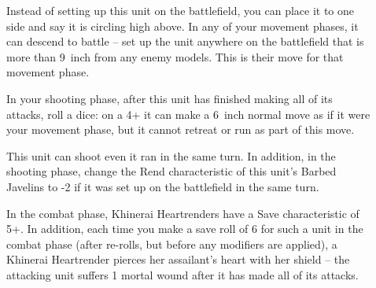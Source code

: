 \begin{description}
    \item [] Instead of setting
        up this unit on the battlefield, you can place it to one side and say
        it is circling high above. In any of your movement phases, it can
        descend to battle – set up the unit anywhere on the battlefield that is
        more than 9~inch from any enemy models. This is their move for that
        movement phase.
    \item [] In your shooting phase,
        after this unit has finished making all of its attacks, roll a dice: on
        a 4+ it can make a 6~inch normal move as if it were your movement
        phase, but it cannot retreat or run as part of this move.
    \item [] This unit can shoot
        even it ran in the same turn.  In addition, in the shooting phase,
        change the Rend characteristic of this unit’s Barbed Javelins to -2 if
        it was set up on the battlefield in the same turn. 
    \item [] In the combat
        phase, Khinerai Heartrenders have a Save characteristic of 5+. In
        addition, each time you make a save roll of 6 for such a unit in the
        combat phase (after re-rolls, but before any modifiers are applied),
        a Khinerai Heartrender pierces her assailant’s heart with her shield
        – the attacking unit suffers 1 mortal wound after it has made all of
        its attacks.
\end{description}


